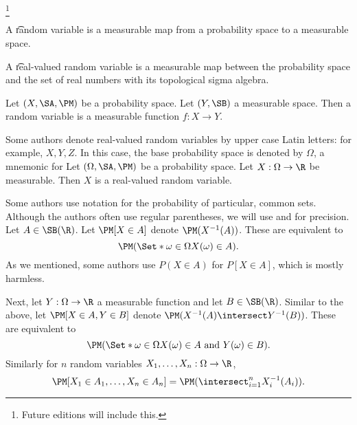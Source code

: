 
  \ifhmode\unskip\fi\footnote{
Future editions will include this.
  }


A \t{random variable} is a measurable map from a probability space to a measurable space.

A \t{real-valued random variable} is a measurable map between the probability space and the set of real numbers with its topological sigma algebra.


Let $(X, \SA, \PM)$ be a probability space.
Let $(Y, \SB)$ a measurable space.
Then a random variable is a measurable function $f: X \to Y$.

Some authors denote real-valued random variables by upper case Latin letters:
for example, $X, Y, Z$. In this case, the base probability space is denoted by $\Omega$, a mnemonic for 
Let $(\Omega,\SA,\PM)$ be a probability space.
Let $X: \Omega \to \R $ be measurable.
Then $X$ is a real-valued random variable.

Some authors use notation for the probability of particular, common sets.
Although the authors often use regular parentheses, we will use \say{$[$} and \say{$]$} for precision.
Let $A \in \SB(\R )$.
Let $\PM[X \in A]$ denote $\PM(X^{-1}(A))$.
These are equivalent to
  \[
\PM(\Set*{\omega  \in \Omega}{X(\omega ) \in A}).
  \]
As we mentioned, some authors use $P(X \in A)$ for $P[X \in A]$, which is mostly harmless.

Next, let $Y: \Omega \to \R $ a measurable function and let $B \in \SB(\R )$.
Similar to the above,
let $\PM[X \in A,Y \in B]$
denote $\PM(X^{-1}(A) \intersect Y^{-1}(B))$.
These are equivalent to
  \[
\PM(\Set*{\omega  \in \Omega}{X(\omega ) \in A \text{ and } Y(\omega ) \in B}).
  \]
Similarly for $n$ random variables $X_1, \dots , X_n: \Omega \to \R $,
  \[
\PM[X_1 \in A_1, \dots , X_n \in A_n] = \PM(\intersect_{i = 1}^{n} X_i^{-1}(A_i)).
  \]
